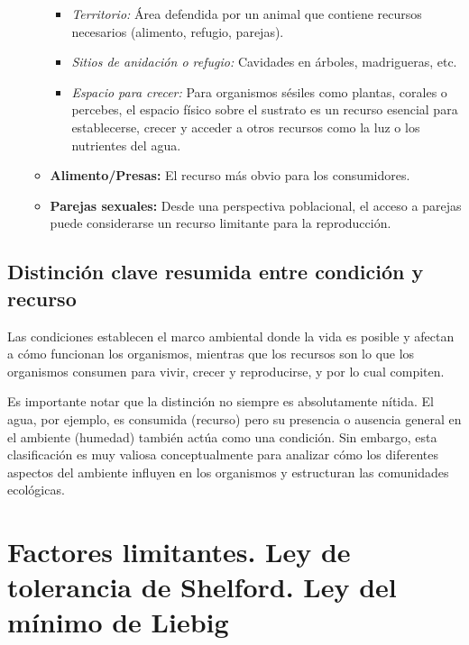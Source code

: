 \documentclass[
]{book}
\providecommand{\tightlist}{%
  \setlength{\itemsep}{0pt}\setlength{\parskip}{0pt}}
\begin{document}
\begin{itemize}
\begin{itemize}
    \begin{itemize}
    \tightlist
    \item
      \emph{Territorio:} Área defendida por un animal que contiene recursos necesarios (alimento, refugio, parejas).
    \item
      \emph{Sitios de anidación o refugio:} Cavidades en árboles, madrigueras, etc.
    \item
      \emph{Espacio para crecer:} Para organismos sésiles como plantas, corales o percebes, el espacio físico sobre el sustrato es un recurso esencial para establecerse, crecer y acceder a otros recursos como la luz o los nutrientes del agua.
    \end{itemize}
  \item
    \textbf{Alimento/Presas:} El recurso más obvio para los consumidores.
  \item
    \textbf{Parejas sexuales:} Desde una perspectiva poblacional, el acceso a parejas puede considerarse un recurso limitante para la reproducción.
  \end{itemize}
\end{itemize}

\subsection*{\texorpdfstring{\textbf{Distinción clave resumida entre condición y recurso}}{Distinción clave resumida entre condición y recurso}}\label{condrec}

Las condiciones establecen el marco ambiental donde la vida es posible y afectan a cómo funcionan los organismos, mientras que los recursos son lo que los organismos consumen para vivir, crecer y reproducirse, y por lo cual compiten.

Es importante notar que la distinción no siempre es absolutamente nítida. El agua, por ejemplo, es consumida (recurso) pero su presencia o ausencia general en el ambiente (humedad) también actúa como una condición. Sin embargo, esta clasificación es muy valiosa conceptualmente para analizar cómo los diferentes aspectos del ambiente influyen en los organismos y estructuran las comunidades ecológicas.

\section*{Factores limitantes. Ley de tolerancia de Shelford. Ley del mínimo de Liebig}\label{factlim}
\end{document}

